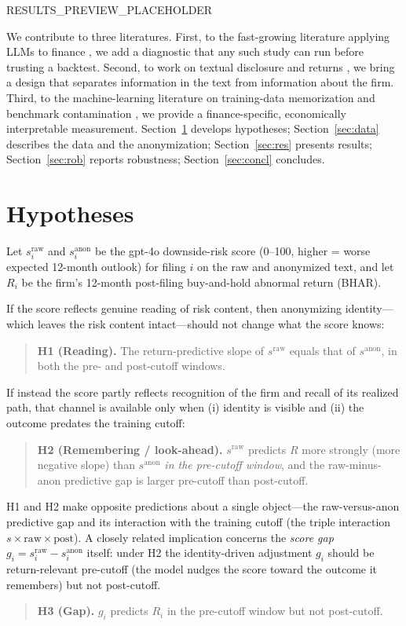 \documentclass[12pt]{article}
\begin{document}
RESULTS_PREVIEW_PLACEHOLDER

We contribute to three literatures. First, to the fast-growing literature applying LLMs to
finance \citep{lopezlira2023,kim2024,jha2024,kelly2019,hansen2023}, we add a diagnostic that
any such study can run before trusting a backtest. Second, to work on textual disclosure and
returns \citep{cohen2020,loughran2011,campbell2014,kravet2013,tetlock2007}, we bring a
design that separates information in the text from information about the firm. Third, to the
machine-learning literature on training-data memorization and benchmark contamination
\citep{carlini2021,sainz2023,magar2022,glasserman2023}, we provide a finance-specific,
economically interpretable measurement. Section~\ref{sec:hyp} develops hypotheses;
Section~\ref{sec:data} describes the data and the anonymization; Section~\ref{sec:res}
presents results; Section~\ref{sec:rob} reports robustness; Section~\ref{sec:concl}
concludes.

\section{Hypotheses}\label{sec:hyp}
Let $s^{\text{raw}}_i$ and $s^{\text{anon}}_i$ be the gpt-4o downside-risk score
(0--100, higher = worse expected 12-month outlook) for filing $i$ on the raw and anonymized
text, and let $R_i$ be the firm's 12-month post-filing buy-and-hold abnormal return (BHAR).

If the score reflects genuine reading of risk content, then anonymizing identity---which
leaves the risk content intact---should not change what the score knows:
\begin{quote}
\textbf{H1 (Reading).} The return-predictive slope of $s^{\text{raw}}$ equals that of
$s^{\text{anon}}$, in both the pre- and post-cutoff windows.
\end{quote}
If instead the score partly reflects recognition of the firm and recall of its realized
path, that channel is available only when (i) identity is visible and (ii) the outcome
predates the training cutoff:
\begin{quote}
\textbf{H2 (Remembering / look-ahead).} $s^{\text{raw}}$ predicts $R$ more strongly
(more negative slope) than $s^{\text{anon}}$ \emph{in the pre-cutoff window}, and the
raw-minus-anon predictive gap is larger pre-cutoff than post-cutoff.
\end{quote}
H1 and H2 make opposite predictions about a single object---the raw-versus-anon predictive
gap and its interaction with the training cutoff (the triple interaction
$s\times\text{raw}\times\text{post}$). A closely related implication concerns the
\emph{score gap} $g_i=s^{\text{raw}}_i-s^{\text{anon}}_i$ itself: under H2 the
identity-driven adjustment $g_i$ should be return-relevant pre-cutoff (the model nudges the
score toward the outcome it remembers) but not post-cutoff.
\begin{quote}
\textbf{H3 (Gap).} $g_i$ predicts $R_i$ in the pre-cutoff window but not post-cutoff.
\end{quote}
\end{document}

